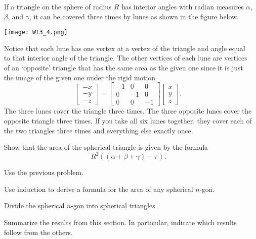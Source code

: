\documentclass[newpage,hints]{ximera}
\begin{document}
If a triangle on the sphere of radius $R$ has interior angles with radian
measures $\alpha$, $\beta$, and $\gamma$, it can be covered three times by
lunes as shown in the figure below.%
\begin{image}
\texttt{[image: W13\_4.png]}%
\end{image}
Notice that each lune has one vertex at a vertex of the triangle and angle
equal to that interior angle of the triangle. The other vertices of each lune
are vertices of an `opposite' triangle that has the same area as the given one
since it is just the image of the given one under the rigid motion%
\[
\begin{bmatrix}-x\\-y\\-z\end{bmatrix}=
\begin{bmatrix}
-1 & 0 & 0\\
0 & -1 & 0\\
0 & 0 & -1
\end{bmatrix}
\begin{bmatrix}x\\y\\z\end{bmatrix}.
\]
The three lunes cover the triangle three times. The three opposite
lunes cover the opposite triangle three times. If you take all six
lunes together, they cover each of the two triangles three times and
everything else exactly once.

\begin{problem}
Show that the area of the spherical triangle is given by the
formula%
\[
R^{2}\left(  \left(  \alpha+\beta+\gamma\right)  -\pi\right).
\]
\begin{hint}
Use the previous problem.
\end{hint}
\end{problem}


\begin{problem}
Use induction to derive a formula for the area of any spherical
$n$-gon.
\begin{hint}
Divide the spherical $n$-gon into spherical triangles.
\end{hint}
\end{problem}


\begin{problem}
Summarize the results from this section. In particular, indicate which
results follow from the others.
\begin{freeResponse}
\end{freeResponse}
\end{problem}
\end{document}
